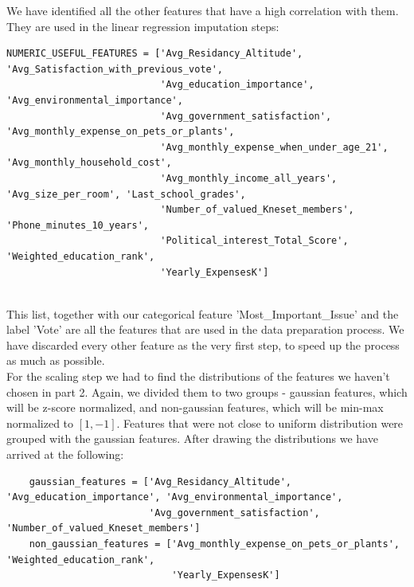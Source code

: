 \documentclass[12pt]{article}
\begin{document}
We have identified all the other features that have a high correlation with them. They are used in the linear regression imputation steps:\\

\begin{adjustbox}{max width=\linewidth}
\begin{lstlisting}
NUMERIC_USEFUL_FEATURES = ['Avg_Residancy_Altitude', 'Avg_Satisfaction_with_previous_vote',
                           'Avg_education_importance', 'Avg_environmental_importance',
                           'Avg_government_satisfaction', 'Avg_monthly_expense_on_pets_or_plants',
                           'Avg_monthly_expense_when_under_age_21', 'Avg_monthly_household_cost',
                           'Avg_monthly_income_all_years', 'Avg_size_per_room', 'Last_school_grades',
                           'Number_of_valued_Kneset_members', 'Phone_minutes_10_years',
                           'Political_interest_Total_Score', 'Weighted_education_rank',
                           'Yearly_ExpensesK']
\end{lstlisting}
\end{adjustbox}\\

This list, together with our categorical feature 'Most\_Important\_Issue' and the label 'Vote' are all the features that are used in the data preparation process. We have discarded every other feature as the very first step, to speed up the process as much as possible.\\
For the scaling step we had to find the distributions of the features we haven't chosen in part 2. Again, we divided them to two groups - gaussian features, which will be z-score normalized, and non-gaussian features, which will be min-max normalized to $[1, -1]$. Features that were not close to uniform distribution were grouped with the gaussian features. After drawing the distributions we have arrived at the following:\\

\begin{adjustbox}{max width=\linewidth}
\begin{lstlisting}
    gaussian_features = ['Avg_Residancy_Altitude', 'Avg_education_importance', 'Avg_environmental_importance',
                         'Avg_government_satisfaction', 'Number_of_valued_Kneset_members']
    non_gaussian_features = ['Avg_monthly_expense_on_pets_or_plants', 'Weighted_education_rank',
                             'Yearly_ExpensesK']
\end{lstlisting}
\end{adjustbox}\\
\end{document}
